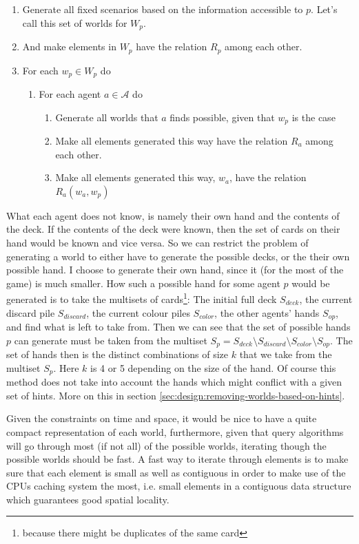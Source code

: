 \begin{enumerate}
	\item Generate all fixed scenarios based on the information accessible to $p$. Let's call this set of worlds for $W_p$. 
	\item And make elements in $W_p$ have the relation $R_p$ among each other.
	\item For each $w_p \in W_p$ do
		\begin{enumerate}
			\item For each agent $a \in \mathcal{A}$ do
				\begin{enumerate}
				\item Generate all worlds that $a$ finds possible, given that $w_p$ is the case
				\item Make all elements generated this way have the relation $R_a$ among each other.
				\item Make all elements generated this way, $w_a$, have the relation $R_a(w_a,w_p)$
				\end{enumerate}
		\end{enumerate}
\end{enumerate}

What each agent does not know, is namely their own hand and the contents of the deck. If the contents of the deck were known, then the set of cards on their hand would be known and vice versa. So we can restrict the problem of generating a world to either have to generate the possible decks, or the their own possible hand. I choose to generate their own hand, since it (for the most of the game) is much smaller.
How such a possible hand for some agent $p$ would be generated is to take the multisets of cards\footnote{because there might be duplicates of the same card}: The initial full deck $S_{deck}$, the current discard pile $S_{discard}$, the current colour piles $S_{color}$, the other agents' hands $S_{op}$, and find what is left to take from. 
 Then we can see that the set of possible hands $p$ can generate must be taken from the multiset $S_p = S_{deck} \setminus S_{discard} \setminus S_{color} \setminus S_{op}$. The set of hands then is the distinct combinations of size $k$ that we take from the multiset $S_p$.
Here $k$ is 4 or 5 depending on the size of the hand.
Of course this method does not take into account the hands which might conflict with a given set of hints. More on this in section \ref{sec:design:removing-worlds-based-on-hints}.


Given the constraints on time and space, it would be nice to have a quite compact representation of each world, furthermore, given that query algorithms will go through most (if not all) of the possible worlds, iterating though the possible worlds should be fast. A fast way to iterate through elements is to make sure that each element is small as well as contiguous in order to make use of the CPUs caching system the most, i.e. small elements in a contiguous data structure which guarantees good spatial locality.



